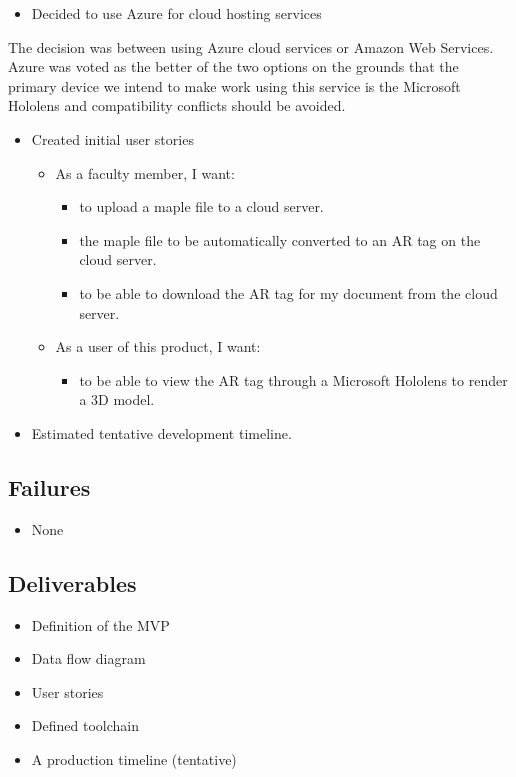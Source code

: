         \begin{itemize} \item Decided to use Azure for cloud hosting services \end {itemize}
        \hspace{7mm}The decision was between using Azure cloud services or Amazon Web Services.
        Azure was voted as the better of the two options on the grounds that the primary device we intend to make work
        using this service is the Microsoft Hololens and compatibility conflicts should be avoided.

        \begin{itemize} 
            \item Created initial user stories 
            \begin{itemize}
                \item As a faculty member, I want:
                \begin{itemize} 
                    \item to upload a maple file to a cloud server.
                    \item the maple file to be automatically converted to an AR tag on the cloud server.
                    \item to be able to download the AR tag for my document from the cloud server.
                \end{itemize}
                \item As a user of this product, I want: 
                \begin{itemize}
                    \item to be able to view the AR tag through a Microsoft Hololens to render a 3D model.
                \end{itemize}
            \end{itemize}
            \item Estimated tentative development timeline.
        \end{itemize}

    \subsection{Failures}
    \label{sec:Sprint0_failures}
        \begin{itemize} \item None \end{itemize}

    \subsection{Deliverables}
    \label{sec:Sprint0_deliverables}
        \begin{itemize} 
            \item Definition of the MVP
            \item Data flow diagram            
            \item User stories
            \item Defined toolchain
            \item A production timeline (tentative)
        \end{itemize}

